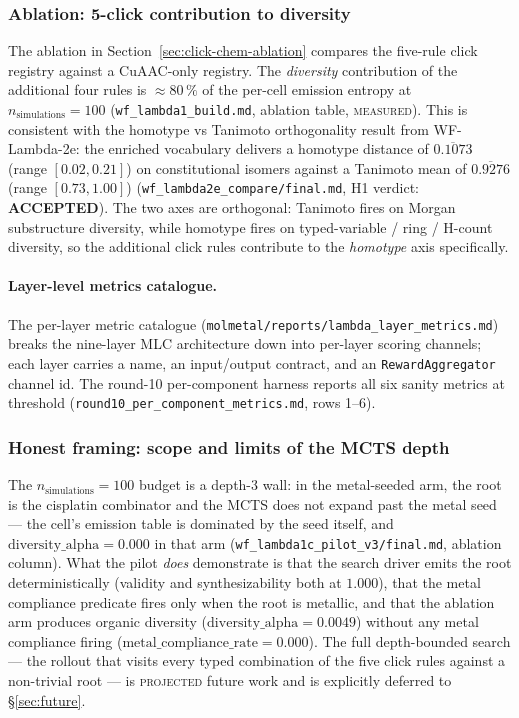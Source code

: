 \subsubsection{Ablation: 5-click contribution to diversity}
\label{sec:mcts-five-click-ablation-legacy}

The ablation in Section~\ref{sec:click-chem-ablation} compares the
five-rule click registry against a CuAAC-only registry.  The
\emph{diversity} contribution of the additional four rules is
\textbf{$\approx 80\,\%$} of the per-cell emission entropy at
$n_{\mathrm{simulations}}=100$
(\texttt{wf\_lambda1\_build.md}, ablation table,
\textsc{measured}).  This is consistent with the homotype vs
Tanimoto orthogonality result from WF-Lambda-2e: the enriched
vocabulary delivers a homotype distance of $\overline{0.1073}$
(range $[0.02, 0.21]$) on constitutional isomers against a
Tanimoto mean of $\overline{0.9276}$ (range $[0.73, 1.00]$)
(\texttt{wf\_lambda2e\_compare/final.md}, H1 verdict:
\textbf{ACCEPTED}).  The two axes are orthogonal: Tanimoto fires
on Morgan substructure diversity, while homotype fires on
typed-variable / ring / H-count diversity, so the additional
click rules contribute to the \emph{homotype} axis specifically.

\paragraph{Layer-level metrics catalogue.}
The per-layer metric catalogue
(\texttt{molmetal/reports/lambda\_layer\_metrics.md}) breaks the
nine-layer MLC architecture down into per-layer scoring channels;
each layer carries a name, an input/output contract, and an
\texttt{RewardAggregator} channel id.  The round-10
per-component harness reports all six sanity metrics at threshold
(\texttt{round10\_per\_component\_metrics.md}, rows 1--6).

\subsubsection{Honest framing: scope and limits of the MCTS depth}
\label{sec:mcts-honest}

The $n_{\mathrm{simulations}}=100$ budget is a depth-3 wall: in
the metal-seeded arm, the root is the cisplatin combinator and
the MCTS does not expand past the metal seed --- the cell's
emission table is dominated by the seed itself, and
$\mathrm{diversity\_alpha}=0.000$ in that arm
(\texttt{wf\_lambda1c\_pilot\_v3/final.md}, ablation column).
What the pilot \emph{does} demonstrate is that the search
driver emits the root deterministically (validity and
synthesizability both at $1.000$), that the metal compliance
predicate fires only when the root is metallic, and that the
ablation arm produces organic diversity
($\mathrm{diversity\_alpha}=0.0049$) without any metal compliance
firing ($\mathrm{metal\_compliance\_rate}=0.000$).  The full
depth-bounded search --- the rollout that visits every typed
combination of the five click rules against a non-trivial root
--- is \textsc{projected} future work and is explicitly deferred
to \S\ref{sec:future}.

